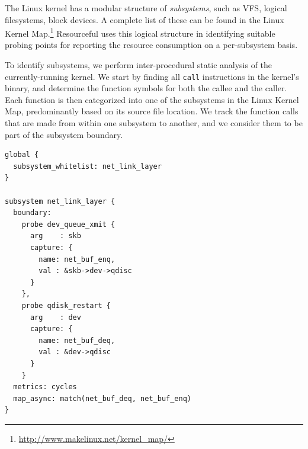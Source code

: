 \documentclass[letterpaper,twocolumn,10pt]{article}
\newcommand{\pname}{Resourceful}
\newcommand{\lnote}[1]{\textcolor{red}{[\textit{#1}]}} %
\begin{document}
The Linux kernel has a modular structure of \emph{subsystems}, such as VFS,
logical filesystems, block devices. A complete list of these can be found in
the Linux Kernel Map.\footnote{\url{http://www.makelinux.net/kernel_map/}} \pname{ }uses this logical structure in identifying suitable probing points for
reporting the resource consumption on a per-subsystem basis.



To identify subsystems, we perform inter-procedural static analysis of the
currently-running kernel. We start by finding all \texttt{call} instructions in
the kernel's binary, and determine the function symbols for both the callee and
the caller. Each function is then categorized into one of the subsystems in the
Linux Kernel Map, predominantly based on its source file location. We track the
function calls that are made from within one subsystem to another, and we
consider them to be part of the subsystem boundary.

\vspace{1em}
\lstset{style=customc, captionpos=b}
\begin{lstlisting}[caption={Sample configuration file defining a custom subsystem},label={lst:config}]
global {
  subsystem_whitelist: net_link_layer
}

subsystem net_link_layer {
  boundary:
    probe dev_queue_xmit {
      arg    : skb
      capture: {
        name: net_buf_enq,
        val : &skb->dev->qdisc
      }
    },
    probe qdisk_restart {
      arg    : dev
      capture: {
        name: net_buf_deq,
        val : &dev->qdisc
      }
    }
  metrics: cycles
  map_async: match(net_buf_deq, net_buf_enq)
}
\end{lstlisting}
\end{document}
